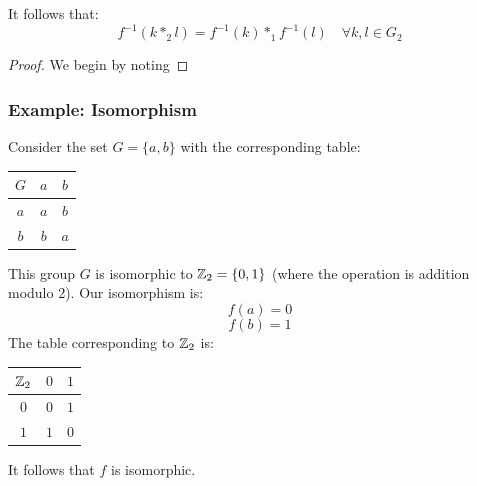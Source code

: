 \documentclass[letterpaper]{article}
\begin{document}
\begin{corollary}{}{}
    It follows that:
    \[f^{-1}(k *_2 l) = f^{-1}(k) *_1 f^{-1}(l) \quad \forall k, l \in G_2\]
\end{corollary}

\begin{proof}
    We begin by noting 
\end{proof}

\subsubsection{Example: Isomorphism}
Consider the set $G = \{a, b\}$ with the corresponding table: 
\begin{center}
    \begin{tabular}{c|c c}
        $G$ & $a$ & $b$ \\ 
        \hline 
        $a$ & $a$ & $b$ \\ 
        $b$ & $b$ & $a$ 
    \end{tabular}
\end{center} 
This group $G$ is isomorphic to $\mathbb{Z}_2 = \{0, 1\}$ (where the operation is addition modulo 2). Our isomorphism is: 
\[f(a) = 0\]
\[f(b) = 1\]
The table corresponding to $\mathbb{Z}_2$ is:
\begin{center}
    \begin{tabular}{c|c c}
        $\mathbb{Z}_2$ & $0$ & $1$ \\ 
        \hline 
        $0$ & $0$ & $1$ \\ 
        $1$ & $1$ & $0$ 
    \end{tabular}
\end{center}
It follows that $f$ is isomorphic. 
\end{document}
